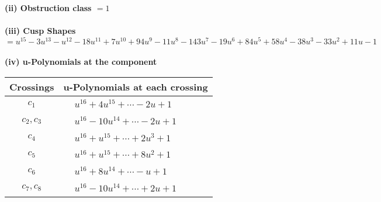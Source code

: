\documentclass[1p]{elsarticle_modified}
\theoremstyle{definition}
\begin{document}
\flushleft \textbf{(ii) Obstruction class $= 1$}\\~\\
\flushleft \textbf{(iii) Cusp Shapes $= u^{15}-3 u^{13}- u^{12}-18 u^{11}+7 u^{10}+94 u^9-11 u^8-143 u^7-19 u^6+84 u^5+58 u^4-38 u^3-33 u^2+11 u-1$}\\~\\
\newpage\renewcommand{\arraystretch}{1}
\flushleft \textbf{(iv) u-Polynomials at the component}\newline \\
\begin{tabular}{m{50pt}|m{274pt}}
Crossings & \hspace{64pt}u-Polynomials at each crossing \\
\hline $$\begin{aligned}c_{1}\end{aligned}$$&$\begin{aligned}
&u^{16}+4 u^{15}+\cdots-2 u+1
\end{aligned}$\\
\hline $$\begin{aligned}c_{2},c_{3}\end{aligned}$$&$\begin{aligned}
&u^{16}-10 u^{14}+\cdots-2 u+1
\end{aligned}$\\
\hline $$\begin{aligned}c_{4}\end{aligned}$$&$\begin{aligned}
&u^{16}+u^{15}+\cdots+2 u^3+1
\end{aligned}$\\
\hline $$\begin{aligned}c_{5}\end{aligned}$$&$\begin{aligned}
&u^{16}+u^{15}+\cdots+8 u^2+1
\end{aligned}$\\
\hline $$\begin{aligned}c_{6}\end{aligned}$$&$\begin{aligned}
&u^{16}+8 u^{14}+\cdots- u+1
\end{aligned}$\\
\hline $$\begin{aligned}c_{7},c_{8}\end{aligned}$$&$\begin{aligned}
&u^{16}-10 u^{14}+\cdots+2 u+1
\end{aligned}$\\

\end{tabular}
\end{document}
